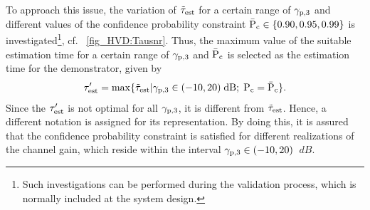 To approach this issue, the variation of $\tilde{\tau}_{\text{est}}$ for a certain range of ${\gamma}_{\text{p,3}}$ and different values of the confidence probability constraint $\bar{\text{P}}_{\text{c}} \in \{0.90, 0.95, 0.99\}$ is investigated\footnote{Such investigations can be performed during the validation process, which is normally included at the system design.}, cf. \figurename~\ref{fig_HVD:Tausnr}. %
Thus, the maximum value of the suitable estimation time for a certain range of ${\gamma}_{\text{p,3}}$ and $\bar{\text{P}}_{\text{c}}$ is selected as the estimation time for the demonstrator, given by \begin{equation}
{\tau}\sp{\prime}_{\text{est}} = \operatorname*{max}\{ \tilde{\tau}_{\text{est}} | {\gamma}_{\text{p,3}} \in (-10,20)\;\SI{}{dB}; \;\text{P}_{\text{c}} = \bar{\text{P}}_{\text{c}} \}.\end{equation} Since the ${\tau}\sp{\prime}_{\text{est}}$ is not optimal for all ${\gamma}_{\text{p,3}}$, it is different from $\tilde{\tau}_{\text{est}}$. Hence, a different notation is assigned for its representation. By doing this, it is assured that the confidence probability constraint is satisfied for different realizations of the channel gain, which reside within the interval ${\gamma}_{\text{p,3}} \in (-10,20)$ $\SI{}{dB}$. 
%	
